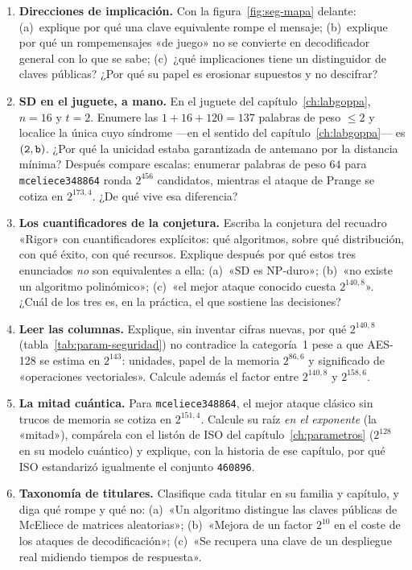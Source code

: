 \documentclass[11pt,a4paper,oneside]{report}
\newcommand{\hx}[1]{\text{\texttt{#1}}}
\begin{document}
\begin{enumerate}[leftmargin=1.6em,itemsep=4pt]
  \item \textbf{Direcciones de implicación.} Con la
        figura~\ref{fig:seg-mapa} delante: (a)~explique por qué una
        clave equivalente rompe el mensaje; (b)~explique por qué un
        rompemensajes «de juego» no se convierte en decodificador
        general con lo que se sabe; (c)~¿qué implicaciones tiene un
        distinguidor de claves públicas? ¿Por qué su papel es
        erosionar supuestos y no descifrar?
  \item \textbf{SD en el juguete, a mano.} En el juguete del
        capítulo~\ref{ch:labgoppa}, $n=16$ y $t=2$. Enumere las
        $1+16+120=137$ palabras de peso $\le2$ y localice la única
        cuyo síndrome ---en el sentido del
        capítulo~\ref{ch:labgoppa}--- es $(\hx2,\hx b)$. ¿Por qué
        la unicidad estaba garantizada de antemano por la distancia
        mínima? Después compare escalas: enumerar palabras de peso
        $64$ para \texttt{mceliece348864} ronda $2^{456}$ candidatos,
        mientras el ataque de Prange se cotiza en $2^{173{,}4}$.
        ¿De qué vive esa diferencia?
  \item \textbf{Los cuantificadores de la conjetura.} Escriba la
        conjetura del recuadro «Rigor» con cuantificadores
        explícitos: qué algoritmos, sobre qué distribución, con qué
        éxito, con qué recursos. Explique después por qué estos tres
        enunciados \emph{no} son equivalentes a ella:
        (a)~«SD es NP-duro»; (b)~«no existe un algoritmo
        polinómico»; (c)~«el mejor ataque conocido cuesta
        $2^{140{,}8}$». ¿Cuál de los tres es, en la práctica, el que
        sostiene las decisiones?
  \item \textbf{Leer las columnas.} Explique, sin inventar cifras
        nuevas, por qué $2^{140{,}8}$ (tabla~\ref{tab:param-seguridad})
        no contradice la categoría~1 pese a que AES-128 se estima en
        $2^{143}$: unidades, papel de la memoria $2^{86{,}6}$ y
        significado de «operaciones vectoriales». Calcule además el
        factor entre $2^{140{,}8}$ y $2^{158{,}6}$.
  \item \textbf{La mitad cuántica.} Para \texttt{mceliece348864}, el
        mejor ataque clásico sin trucos de memoria se cotiza en
        $2^{151{,}4}$. Calcule su raíz \emph{en el exponente} (la
        «mitad»), compárela con el listón de ISO del
        capítulo~\ref{ch:parametros} ($2^{128}$ en su modelo
        cuántico) y explique, con la historia de ese capítulo, por
        qué ISO estandarizó igualmente el conjunto \texttt{460896}.
  \item \textbf{Taxonomía de titulares.} Clasifique cada titular en
        su familia y capítulo, y diga qué rompe y qué no:
        (a)~«Un algoritmo distingue las claves públicas de McEliece
        de matrices aleatorias»; (b)~«Mejora de un factor $2^{10}$
        en el coste de los ataques de decodificación»; (c)~«Se
        recupera una clave de un despliegue real midiendo tiempos de
        respuesta».
\end{enumerate}
\end{document}
